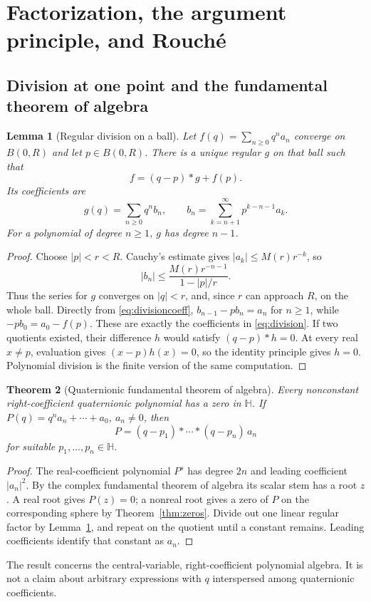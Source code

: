 \documentclass[11pt,a4paper]{article}
\numberwithin{equation}{section}
\newtheorem{theorem}{Theorem}[section]
\newtheorem{lemma}[theorem]{Lemma}
\theoremstyle{definition}
\theoremstyle{remark}
\newcommand{\HH}{\mathbb H}
\begin{document}
\section{Factorization, the argument principle, and Rouch\'e}
\label{sec:counting}
\subsection{Division at one point and the fundamental theorem of algebra}
\begin{lemma}[Regular division on a ball]
\label{lem:division}
Let $f(q)=\sum_{n\ge0}q^n a_n$ converge on $B(0,R)$ and let $p\in B(0,R)$.
There is a unique regular $g$ on that ball such that
\begin{equation}
 f=(q-p)*g+f(p).
 \label{eq:division}
\end{equation}
Its coefficients are
\begin{equation}
 g(q)=\sum_{n\ge0}q^n b_n,
 \qquad b_n=\sum_{k=n+1}^{\infty}p^{k-n-1}a_k.
 \label{eq:divisioncoeff}
\end{equation}
For a polynomial of degree $n\ge1$, $g$ has degree $n-1$.
\end{lemma}
\begin{proof}
Choose $|p|<r<R$. Cauchy's estimate gives $|a_k|\le M(r)r^{-k}$, so
\[
 |b_n|\le\frac{M(r)r^{-n-1}}{1-|p|/r}.
\]
Thus the series for $g$ converges on $|q|<r$, and, since $r$ can approach $R$,
on the whole ball. Directly from \eqref{eq:divisioncoeff},
$b_{n-1}-p b_n=a_n$ for $n\ge1$, while
$-p b_0=a_0-f(p)$. These are exactly the coefficients in
\eqref{eq:division}. If two quotients existed, their difference $h$ would
satisfy $(q-p)*h=0$. At every real $x\ne p$, evaluation gives $(x-p)h(x)=0$,
so the identity principle gives $h=0$. Polynomial division is the finite
version of the same computation.
\end{proof}

\begin{theorem}[Quaternionic fundamental theorem of algebra]
\label{thm:FTA}
Every nonconstant right-coefficient quaternionic polynomial has a zero in
$\HH$. If
$P(q)=q^n a_n+\cdots+a_0$, $a_n\ne0$, then
\begin{equation}
 P=(q-p_1)*\cdots*(q-p_n)\,a_n
 \label{eq:factorization}
\end{equation}
for suitable $p_1,\ldots,p_n\in\HH$.
\end{theorem}
\begin{proof}
The real-coefficient polynomial $P^s$ has degree $2n$ and leading coefficient
$|a_n|^2$. By the complex fundamental theorem of algebra its scalar stem has
a root $z$. A real root gives $P(z)=0$; a nonreal root gives a zero of $P$ on
the corresponding sphere by Theorem~\ref{thm:zeros}. Divide out one linear
regular factor by Lemma~\ref{lem:division}, and repeat on the quotient until
a constant remains. Leading coefficients identify that constant as $a_n$.
\end{proof}
The result concerns the central-variable, right-coefficient polynomial algebra.
It is not a claim about arbitrary expressions with $q$ interspersed among
quaternionic coefficients.
\end{document}
